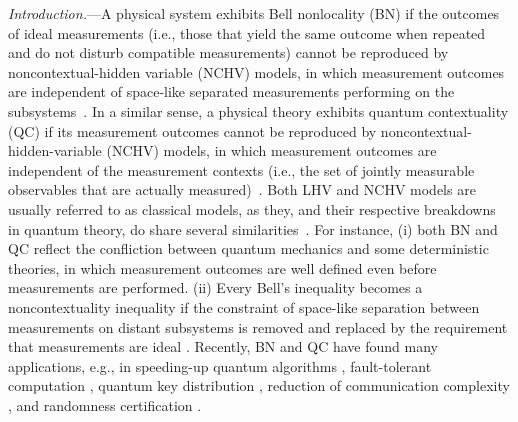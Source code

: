 \documentclass[prl,letterpaper,english,reprint,nofootinbib,aps,superscriptaddress,showpacs,showkeys]{revtex4-1}
\theoremstyle{definition}
\theoremstyle{remark}
\begin{document}

\maketitle


\emph{Introduction.}---A physical system exhibits Bell nonlocality (BN) if the outcomes of ideal measurements (i.e., those that yield the same outcome when repeated and do not disturb compatible measurements) cannot be reproduced by noncontextual-hidden variable (NCHV) models, in which measurement outcomes are independent of space-like separated measurements performing on the subsystems~\cite{Bell66}. In a similar sense, a physical theory exhibits quantum contextuality (QC) if its measurement outcomes cannot be reproduced by noncontextual-hidden-variable (NCHV) models, in which measurement outcomes are independent of the measurement contexts (i.e., the set of jointly measurable observables that are actually measured)~\cite{KS67}. Both LHV and NCHV models are usually referred to as classical models, as they, and their respective breakdowns in quantum theory, do share several similarities~\cite{Mermin}.
For instance, (i) both BN and QC reflect the confliction between quantum mechanics and some deterministic theories, in which measurement outcomes are well defined even before measurements are performed.
(ii) Every Bell's inequality becomes a noncontextuality inequality if the constraint of space-like separation between measurements on distant subsystems is removed and replaced by the requirement that measurements are ideal \cite{Mermin,RDLTC14}.
Recently, BN and QC have found many applications, e.g., in speeding-up quantum algorithms \cite{Howard}, fault-tolerant computation \cite{Raussendorf13}, quantum key distribution \cite{Ekert91}, reduction of communication complexity \cite{BCMW10}, and randomness certification \cite{PAMBMMOHLMM10}.
\end{document}
